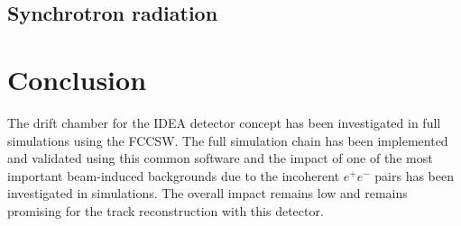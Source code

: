 \documentclass{article}
\begin{document}
\subsection{Synchrotron radiation}


\section{Conclusion}
The drift chamber for the IDEA detector concept has been investigated in full simulations using the FCCSW. The full simulation chain has been implemented and validated using this common software and the impact of one of the most important beam-induced backgrounds due to the incoherent $e^+e^-$ pairs has been investigated in simulations. The overall impact remains low and remains promising for the track reconstruction with this detector.



\end{document}
